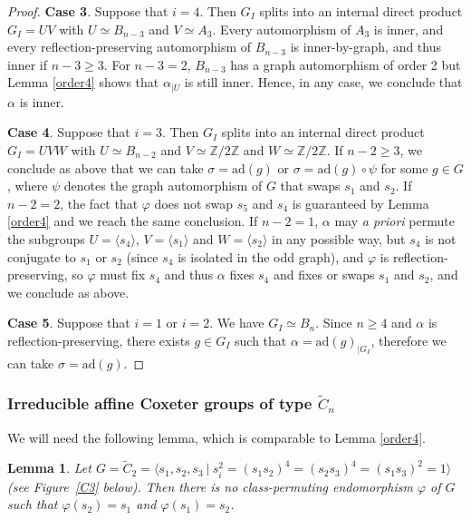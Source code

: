 \documentclass[a4paper, 11pt]{amsart}
\newtheorem{lemme}[te]{Lemma}
\theoremstyle{definition}
\theoremstyle{remark}
\renewcommand{\geq}{\geqslant}
\begin{document}
\begin{proof}
\smallskip
\noindent \textbf{Case 3}. Suppose that $i=4$. Then $G_I$ splits into an internal direct product $G_I=UV$ with $U\simeq B_{n-3}$ and $V\simeq A_3$. Every automorphism of $A_3$ is inner, and every reflection-preserving automorphism of $B_{n-3}$ is inner-by-graph, and thus inner if $n-3\geq 3$. For $n-3=2$, $B_{n-3}$ has a graph automorphism of order 2 but Lemma \ref{order4} shows that $\alpha_{\vert U}$ is still inner. Hence, in any case, we conclude that $\alpha$ is inner. 

\smallskip \noindent \textbf{Case 4}. Suppose that $i=3$. Then $G_I$ splits into an internal direct product $G_I=UVW$ with $U\simeq B_{n-2}$ and $V\simeq \mathbb{Z}/2\mathbb{Z}$ and $W\simeq \mathbb{Z}/2\mathbb{Z}$. If $n-2\geq 3$, we conclude as above that we can take $\sigma=\mathrm{ad}(g)$ or $\sigma=\mathrm{ad}(g)\circ \psi$ for some $g\in G$, where $\psi$ denotes the graph automorphism of $G$ that swaps $s_1$ and $s_2$. If $n-2=2$, the fact that $\varphi$ does not swap $s_5$ and $s_4$ is guaranteed by Lemma \ref{order4} and we reach the same conclusion. If $n-2=1$, $\alpha$ may \emph{a priori} permute the subgroups $U=\langle s_4\rangle$, $V=\langle s_1\rangle$ and $W=\langle s_2\rangle$ in any possible way, but $s_4$ is not conjugate to $s_1$ or $s_2$ (since $s_4$ is isolated in the odd graph), and $\varphi$ is reflection-preserving, so $\varphi$ must fix $s_4$ and thus $\alpha$ fixes $s_4$ and fixes or swaps $s_1$ and $s_2$, and we conclude as above.

\smallskip
\noindent \textbf{Case 5}. Suppose that $i=1$ or $i=2$. We have $G_I\simeq B_n$. Since $n\geq 4$ and $\alpha$ is reflection-preserving, there exists $g\in G_I$ such that $\alpha=\mathrm{ad}(g)_{\vert G_I}$, therefore we can take $\sigma=\mathrm{ad}(g)$.\end{proof}

\subsubsection{Irreducible affine Coxeter groups of type $\tilde{C}_n$}

We will need the following lemma, which is comparable to Lemma \ref{order4}.

\begin{lemme}\label{order4bis}
Let $G=\tilde{C}_2=\langle s_1,s_2,s_3 \ \vert \ s_i^2=(s_1s_2)^4=(s_2s_3)^4=(s_1s_3)^2=1\rangle$ (see Figure~\ref{C3} below). Then there is no class-permuting endomorphism $\varphi$ of $G$ such that $\varphi(s_2)=s_1$ and $\varphi(s_1)=s_2$.
\end{lemme}
\end{document}
